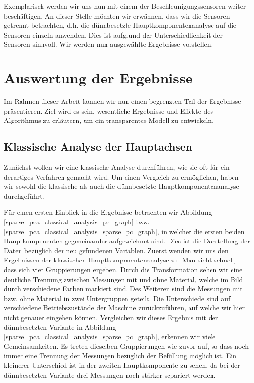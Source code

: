 Exemplarisch werden wir uns nun mit einem der Beschleunigungssensoren weiter beschäftigen. An dieser Stelle möchten wir erwähnen, dass wir die Sensoren getrennt betrachten, d.h. die dünnbesetzte Hauptkomponentenanalyse auf die Sensoren einzeln anwenden. Dies ist aufgrund der Unterschiedlichkeit der Sensoren sinnvoll. Wir werden nun ausgewählte Ergebnisse vorstellen. 




\section{Auswertung der Ergebnisse}
\label{evaluation}

Im Rahmen dieser Arbeit können wir nun einen begrenzten Teil der Ergebnisse präsentieren. Ziel wird es sein, wesentliche Ergebnisse und Effekte des Algorithmus zu erläutern, um ein transparentes Modell zu entwickeln.




\subsection{Klassische Analyse der Hauptachsen}

Zunächst wollen wir eine klassische Analyse durchführen, wie sie oft für ein derartiges Verfahren gemacht wird. Um einen Vergleich zu ermöglichen, haben wir sowohl die klassische als auch die dünnbesetzte Hauptkomponentenanalyse durchgeführt. 

Für einen ersten Einblick in die Ergebnisse betrachten wir Abbildung \ref{sparse_pca_classical_analysis_pc_graph} bzw. \ref{sparse_pca_classical_analysis_sparse_pc_graph}, in welcher die ersten beiden Hauptkomponenten gegeneinander aufgezeichnet sind. Dies ist die Darstellung der Daten bezüglich der neu gefundenen Variablen. Zuerst wenden wir uns den Ergebnissen der klassischen Hauptkomponentenanalyse zu. Man sieht schnell, dass sich vier Gruppierungen ergeben. Durch die Transformation sehen wir eine deutliche Trennung zwischen Messungen mit und ohne Material, welche im Bild durch verschiedene Farben markiert sind. Des Weiteren sind die Messungen mit bzw. ohne Material in zwei Untergruppen geteilt. Die Unterschiede sind auf verschiedene Betriebszustände der Maschine zurückzuführen, auf welche wir hier nicht genauer eingehen können. Vergleichen wir dieses Ergebnis mit der dünnbesetzten Variante in Abbildung \ref{sparse_pca_classical_analysis_sparse_pc_graph}, erkennen wir viele Gemeinsamkeiten. Es treten dieselben Gruppierungen wie zuvor auf, so dass noch immer eine Trennung der Messungen bezüglich der Befüllung möglich ist. Ein kleinerer Unterschied ist in der zweiten Hauptkomponente zu sehen, da bei der dünnbesetzten Variante drei Messungen noch stärker separiert werden.

